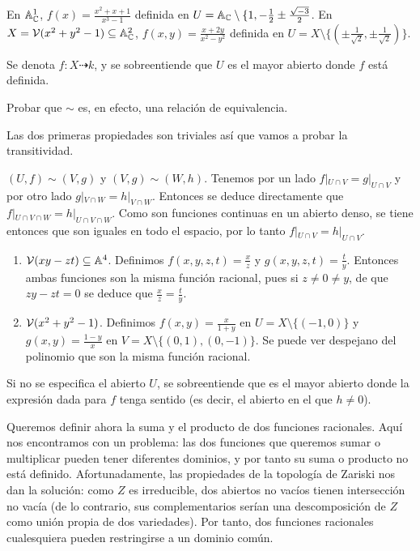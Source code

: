 \documentclass[ACGA.tex]{subfiles}
\begin{document}
\begin{ej}
En $\mathbb{A}^1_{\mathbb{C}}$, $f(x)=\frac{x^2+x+1}{x^3-1}$ definida en $U=\mathbb{A}_{\mathbb{C}}\setminus\{1,-\frac{1}{2}\pm\frac{\sqrt{-3}}{2}$. En $X=\mathcal{V}(x^2+y^2-1)\subseteq\mathbb{A}^2_{\mathbb{C}}$, $f(x,y)=\frac{x+2y}{x^2-y^2}$ definida en $U=X\setminus\{(\pm\frac{1}{\sqrt{2}},\pm\frac{1}{\sqrt{2}})\}$.
\end{ej}
\begin{nota}
Se denota $f: X\dashrightarrow k$, y se sobreentiende que $U$ es el mayor abierto donde $f$ está definida.
\end{nota}


\begin{ejer}
 Probar que $\sim$ es, en efecto, una relación de equivalencia.
\end{ejer}

\begin{solucion}
Las dos primeras propiedades son triviales así que vamos a probar la transitividad. 

$(U,f)\sim (V,g)$ y $(V,g)\sim (W,h)$. Tenemos por un lado $f|_{U\cap V}=g|_{U\cap V}$ y por otro lado $g|_{V\cap W}=h|_{V\cap W}$. Entonces se deduce directamente que $f|_{U\cap V\cap W}=h|_{U\cap V\cap W}$. Como son funciones continuas en un abierto denso, se tiene entonces que son iguales en todo el espacio, por lo tanto $f|_{U\cap V}=h|_{U\cap V}$.
\end{solucion}

\begin{ej}
\begin{enumerate}
\item $\mathcal{V}(xy-zt)\subseteq\mathbb{A}^4$. Definimos $f(x,y,z,t)=\frac{x}{z}$ y $g(x,y,z,t)=\frac{t}{y}$. Entonces ambas funciones son la misma función racional, pues si $z\neq 0\neq y$, de que $zy-zt=0$ se deduce que $\frac{x}{z}=\frac{t}{y}$. 
\item $\mathcal{V}(x^2+y^2-1)$. Definimos $f(x,y)=\frac{x}{1+y}$ en $U=X\setminus\{(-1,0)\}$ y $g(x,y)=\frac{1-y}{x}$ en $V=X\setminus\{(0,1),(0,-1)\}$. Se puede ver despejano del polinomio que son la misma función racional.
\end{enumerate}
\end{ej}

Si no se especifica el abierto $U$, se sobreentiende que es el mayor abierto donde la expresión dada para $f$ tenga sentido (es decir, el abierto en el que $h\neq 0$).


Queremos definir ahora la suma y el producto de dos funciones racionales. Aquí nos encontramos con un problema: las dos funciones que queremos sumar o multiplicar pueden tener diferentes dominios, y por tanto su suma o producto no está definido. Afortunadamente, las propiedades de la topología de Zariski nos dan la solución: como $Z$ es irreducible, dos abiertos no vacíos tienen intersección no vacía (de lo contrario, sus complementarios serían una descomposición de $Z$ como unión propia de dos variedades). Por tanto, dos funciones racionales cualesquiera pueden restringirse a un dominio común. 
\end{document}
